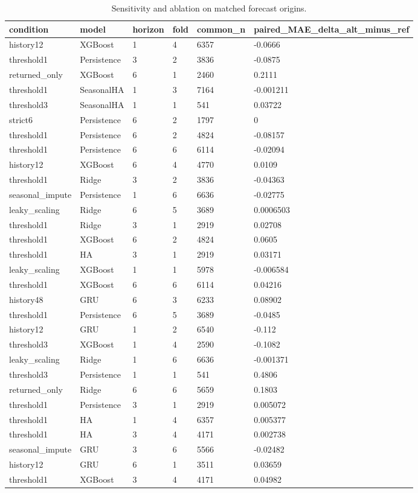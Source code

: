 \begin{table}[!htbp]
\centering
\caption{Sensitivity and ablation on matched forecast origins.}
\begin{tabular}{llllll}
\hline
condition & model & horizon & fold & common\_n & paired\_MAE\_delta\_alt\_minus\_ref \\ 
\hline
history12 & XGBoost & 1 & 4 & 6357 & -0.0666 \\
threshold1 & Persistence & 3 & 2 & 3836 & -0.0875 \\
returned\_only & XGBoost & 6 & 1 & 2460 & 0.2111 \\
threshold1 & SeasonalHA & 1 & 3 & 7164 & -0.001211 \\
threshold3 & SeasonalHA & 1 & 1 & 541 & 0.03722 \\
strict6 & Persistence & 6 & 2 & 1797 & 0 \\
threshold1 & Persistence & 6 & 2 & 4824 & -0.08157 \\
threshold1 & Persistence & 6 & 6 & 6114 & -0.02094 \\
history12 & XGBoost & 6 & 4 & 4770 & 0.0109 \\
threshold1 & Ridge & 3 & 2 & 3836 & -0.04363 \\
seasonal\_impute & Persistence & 1 & 6 & 6636 & -0.02775 \\
leaky\_scaling & Ridge & 6 & 5 & 3689 & 0.0006503 \\
threshold1 & Ridge & 3 & 1 & 2919 & 0.02708 \\
threshold1 & XGBoost & 6 & 2 & 4824 & 0.0605 \\
threshold1 & HA & 3 & 1 & 2919 & 0.03171 \\
leaky\_scaling & XGBoost & 1 & 1 & 5978 & -0.006584 \\
threshold1 & XGBoost & 6 & 6 & 6114 & 0.04216 \\
history48 & GRU & 6 & 3 & 6233 & 0.08902 \\
threshold1 & Persistence & 6 & 5 & 3689 & -0.0485 \\
history12 & GRU & 1 & 2 & 6540 & -0.112 \\
threshold3 & XGBoost & 1 & 4 & 2590 & -0.1082 \\
leaky\_scaling & Ridge & 1 & 6 & 6636 & -0.001371 \\
threshold3 & Persistence & 1 & 1 & 541 & 0.4806 \\
returned\_only & Ridge & 6 & 6 & 5659 & 0.1803 \\
threshold1 & Persistence & 3 & 1 & 2919 & 0.005072 \\
threshold1 & HA & 1 & 4 & 6357 & 0.005377 \\
threshold1 & HA & 3 & 4 & 4171 & 0.002738 \\
seasonal\_impute & GRU & 3 & 6 & 5566 & -0.02482 \\
history12 & GRU & 6 & 1 & 3511 & 0.03659 \\
threshold1 & XGBoost & 3 & 4 & 4171 & 0.04982 \\
\hline
\end{tabular}
\end{table}
